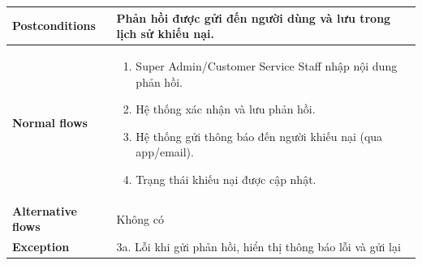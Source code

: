 \begin{itemize}
\begin{center}
\begin{longtable}{|m{}|m{}|}
      \hline
      \textbf{Postconditions} &
      Phản hồi được gửi đến người dùng và lưu trong lịch sử khiếu nại.\\
      \hline
      \textbf{Normal flows} &
      \begin{enumerate}[label=\arabic*.]
        \item Super Admin/Customer Service Staff nhập nội dung phản hồi.
        \item Hệ thống xác nhận và lưu phản hồi.
        \item Hệ thống gửi thông báo đến người khiếu nại (qua app/email).
        \item Trạng thái khiếu nại được cập nhật.
      \end{enumerate}\\
      \hline
      \textbf{Alternative flows} &
      Không có\\
      \hline
      \textbf{Exception} &
      3a. Lỗi khi gửi phản hồi, hiển thị thông báo lỗi và gửi lại\\
      \hline
      \end{longtable}
  \end{center}
\end{itemize}


